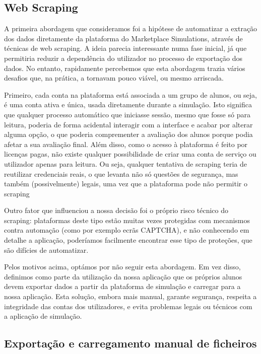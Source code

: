 \subsection{Web Scraping}
A primeira abordagem que consideramos foi a hipótese de automatizar a extração dos dados diretamente da plataforma do Marketplace Simulations, através de técnicas de web scraping. A ideia parecia interessante numa fase inicial, já que permitiria reduzir a dependência do utilizador no processo de exportação  dos dados. No entanto, rapidamente percebemos que esta abordagem trazia vários desafios que, na prática, a tornavam pouco viável, ou mesmo arriscada.

Primeiro, cada conta na plataforma está associada a um grupo de alunos, ou seja, é uma conta ativa e única, usada diretamente durante a simulação. Isto significa que qualquer processo automático que iniciasse sessão, mesmo que fosse só para leitura, poderia de forma acidental interagir com a interface e acabar por alterar alguma opção, o que poderia comprementer a avaliação dos alunos porque podia afetar a sua avaliação final. Além disso, como o acesso à plataforma é feito por licenças pagas, não existe qualquer possibilidade de criar uma conta de serviço ou utilizador apenas para leitura. Ou seja, qualquer tentativa de scraping teria de reutilizar credenciais reais, o que levanta não só questões de segurança, mas também (possivelmente) legais, uma vez que a plataforma pode não permitir o scraping

Outro fator que influenciou a nossa decisão foi o próprio risco técnico do scraping: plataformas deste tipo estão muitas vezes protegidas com mecanismos contra automação (como por exemplo ecrãs CAPTCHA), e não conhecendo em detalhe a aplicação, poderíamos facilmente encontrar esse tipo de proteções, que são difícies de automatizar.

Pelos motivos acima, optámos por não seguir esta abordagem. Em vez disso, definimos como parte da utilização da nossa aplicação que os próprios alunos devem exportar dados a partir da plataforma de simulação e carregar para a nossa aplicação. Esta solução, embora mais manual, garante segurança, respeita a integridade das contas dos utilizadores, e evita problemas legais ou técnicos com a aplicação de simulação.

\subsection{Exportação e carregamento manual de ficheiros}


